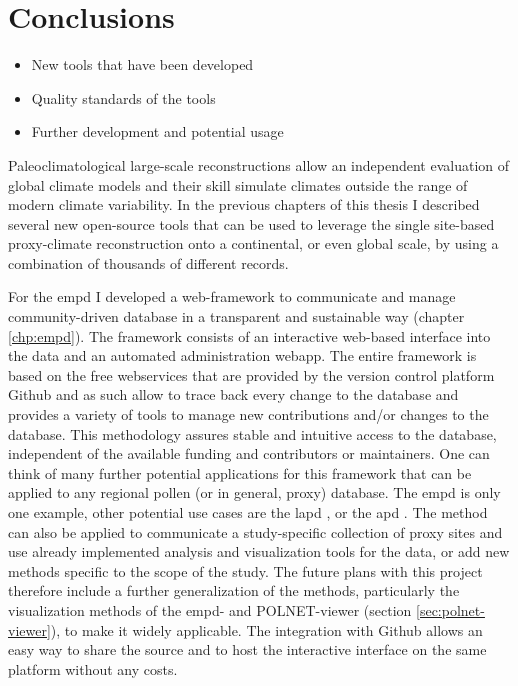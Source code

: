 
\chapter{Conclusions} 

\label{chp:conclusions}

\begin{refsection}

\begin{itemize}
	\item New tools that have been developed
	\item Quality standards of the tools
	\item Further development and potential usage
\end{itemize}

Paleoclimatological large-scale reconstructions allow an independent evaluation of global climate models and their skill simulate climates outside the range of modern climate variability. In the previous chapters of this thesis I described several new open-source tools that can be used to leverage the single site-based proxy-climate reconstruction onto a continental, or even global scale, by using a combination of thousands of different records. 

For the \gls{empd} \citep{DavisChevalierSommerEtAlinprep} I developed a web-framework to communicate and manage community-driven database in a transparent and sustainable way (chapter \ref{chp:empd}). The framework consists of an interactive web-based interface into the data and an automated administration webapp. The entire framework is based on the free webservices that are provided by the version control platform Github and as such allow to trace back every change to the database and provides a variety of tools to manage new contributions and/or changes to the database. This methodology assures stable and intuitive access to the database, independent of the available funding and contributors or maintainers. One can think of many further potential applications for this framework that can be applied to any regional pollen (or in general, proxy) database. The \gls{empd} is only one example, other potential use cases are the \gls{lapd} \citep{FlantuaHooghiemstraGrimmEtAl2015}, or the \gls{apd} \citep{VincensLezineBuchetEtAl2007}. The method can also be applied to communicate a study-specific collection of proxy sites and use already implemented analysis and visualization tools for the data, or add new methods specific to the scope of the study. The future plans with this project therefore include a further generalization of the methods, particularly the visualization methods of the \gls{empd}- and POLNET-viewer (section \ref{sec:polnet-viewer}), to make it widely applicable. The integration with Github allows an easy way to share the source and to host the interactive interface on the same platform without any costs.


\end{refsection}
